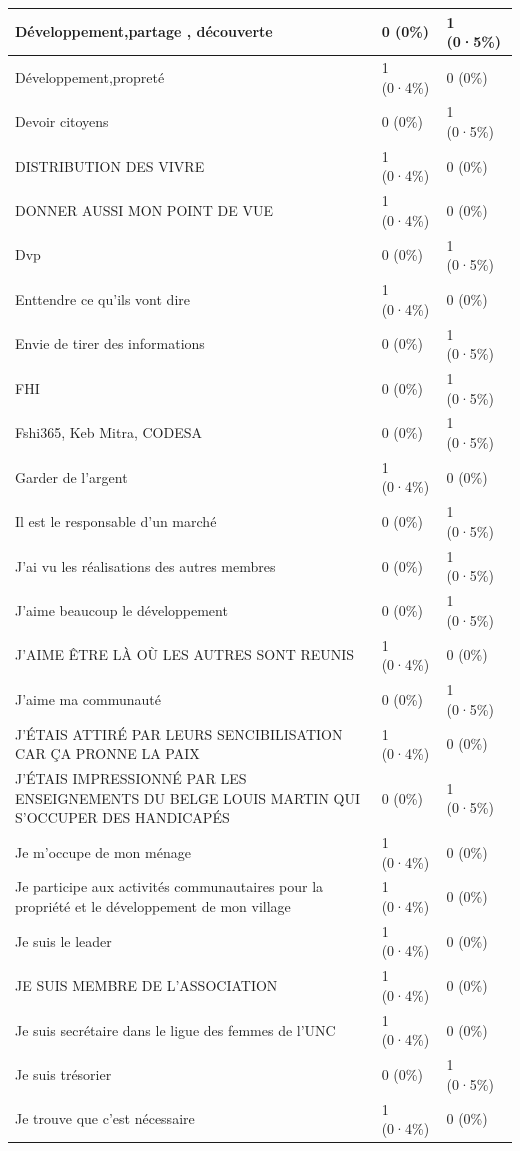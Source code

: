 \documentclass[
]{book}
\begin{document}
\begin{tabular}{l|l|l}
\hline
Développement,partage , découverte & 0 (0\%) & 1 (0·5\%)\\
\hline
Développement,propreté & 1 (0·4\%) & 0 (0\%)\\
\hline
Devoir citoyens & 0 (0\%) & 1 (0·5\%)\\
\hline
DISTRIBUTION DES VIVRE & 1 (0·4\%) & 0 (0\%)\\
\hline
DONNER AUSSI MON POINT DE VUE & 1 (0·4\%) & 0 (0\%)\\
\hline
Dvp & 0 (0\%) & 1 (0·5\%)\\
\hline
Enttendre ce qu'ils vont dire & 1 (0·4\%) & 0 (0\%)\\
\hline
Envie de tirer des informations & 0 (0\%) & 1 (0·5\%)\\
\hline
FHI & 0 (0\%) & 1 (0·5\%)\\
\hline
Fshi365, Keb Mitra, CODESA & 0 (0\%) & 1 (0·5\%)\\
\hline
Garder de l'argent & 1 (0·4\%) & 0 (0\%)\\
\hline
Il est le responsable d'un marché & 0 (0\%) & 1 (0·5\%)\\
\hline
J'ai vu les réalisations des autres membres & 0 (0\%) & 1 (0·5\%)\\
\hline
J'aime beaucoup le développement & 0 (0\%) & 1 (0·5\%)\\
\hline
J'AIME ÊTRE LÀ OÙ LES AUTRES SONT REUNIS & 1 (0·4\%) & 0 (0\%)\\
\hline
J'aime ma communauté & 0 (0\%) & 1 (0·5\%)\\
\hline
J'ÉTAIS ATTIRÉ PAR LEURS SENCIBILISATION CAR   ÇA PRONNE LA PAIX & 1 (0·4\%) & 0 (0\%)\\
\hline
J'ÉTAIS IMPRESSIONNÉ PAR LES ENSEIGNEMENTS DU BELGE LOUIS MARTIN QUI S'OCCUPER DES HANDICAPÉS & 0 (0\%) & 1 (0·5\%)\\
\hline
Je m'occupe de mon ménage & 1 (0·4\%) & 0 (0\%)\\
\hline
Je participe aux activités communautaires pour la propriété et le développement de mon village & 1 (0·4\%) & 0 (0\%)\\
\hline
Je suis le leader & 1 (0·4\%) & 0 (0\%)\\
\hline
JE SUIS MEMBRE DE L'ASSOCIATION & 1 (0·4\%) & 0 (0\%)\\
\hline
Je suis secrétaire dans le ligue des femmes de l'UNC & 1 (0·4\%) & 0 (0\%)\\
\hline
Je suis trésorier & 0 (0\%) & 1 (0·5\%)\\
\hline
Je trouve que c'est nécessaire & 1 (0·4\%) & 0 (0\%)\\

\end{tabular}
\end{document}
